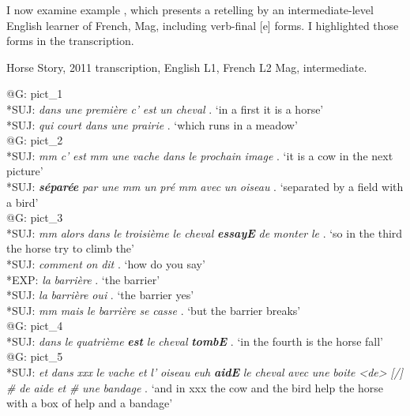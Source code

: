 \documentclass[output=paper,colorlinks,citecolor=brown,modfonts,nonflat]{../langscibook}
\begin{document}
I now examine example , which presents a retelling by an intermediate-level English learner of French, Mag, including verb-final [e] forms. I highlighted those forms in the transcription.

\newpage
\ea%
    \label{ex:leclerq:1}

         Horse Story, 2011 transcription, English L1, French L2 Mag, intermediate.

@G:  pict\_1\\
*SUJ:  \textit{dans} \textit{une} \textit{première} \textit{c'} \textit{est} \textit{un} \textit{cheval} . ‘in a first it is a horse’\\
*SUJ:   \textit{qui} \textit{court} \textit{dans} \textit{une} \textit{prairie} . ‘which runs in a meadow’\\
@G:  pict\_2\\
*SUJ:  \textit{mm} \textit{c'} \textit{est} \textit{mm} \textit{une} \textit{vache} \textit{dans} \textit{le} \textit{prochain} \textit{image} . ‘it is a cow in the next picture’\\
*SUJ:  \textbf{\textit{séparée} }\textit{par} \textit{une} \textit{mm} \textit{un} \textit{pré} \textit{mm} \textit{avec} \textit{un} \textit{oiseau} . ‘separated by a field with a bird’\\
@G:  pict\_3\\
*SUJ:  \textit{mm} \textit{alors} \textit{dans} \textit{le} \textit{troisième} \textit{le} \textit{cheval} \textbf{\textit{essayE} }\textit{de} \textit{monter} \textit{le} . ‘so in the third the horse try to climb the’\\
*SUJ:  \textit{comment} \textit{on} \textit{dit} . ‘how do you say’\\
 *EXP:  \textit{la} \textit{barrière} . ‘the barrier’\\
*SUJ:  \textit{la} \textit{barrière} \textit{oui} . ‘the barrier yes’\\
*SUJ:  \textit{mm} \textit{mais} \textit{le} \textit{barrière} \textit{se} \textit{casse} . ‘but the barrier breaks’\\
@G:  pict\_4\\
*SUJ:  \textit{dans} \textit{le} \textit{quatrième} \textbf{\textit{est}} \textit{le} \textit{cheval} \textbf{\textit{tombE}} . ‘in the fourth is the horse fall’\\
@G:  pict\_5\\
*SUJ:  \textit{et} \textit{dans} \textit{xxx} \textit{le} \textit{vache} \textit{et} \textit{l'} \textit{oiseau} \textit{euh} \textbf{\textit{aidE} }\textit{le} \textit{cheval} \textit{avec} \textit{une} \textit{boite} \textit{<de>} \textit{[/]} \textit{\#} \textit{de} \textit{aide} \textit{et} \textit{\#} \textit{une} \textit{bandage} . ‘and in xxx the cow and the bird help the horse with a box of help and a bandage’
\z
\end{document}
